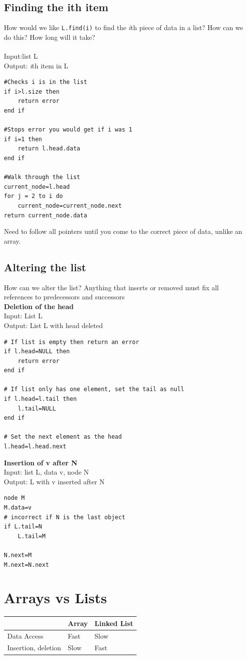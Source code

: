 \documentclass{article}[18pt]
\begin{document}
\subsection{Finding the ith item}
How would we like \texttt{L.find(i)} to find the \textit{i}th piece of data in a list? How can we do this? How long will it take?\\
\\
Input:list L\\
Output: \textit{i}th item in L\\
\begin{lstlisting}[mathescape=true]
#Checks i is in the list
if i>l.size then
	return error
end if

#Stops error you would get if i was 1
if i=1 then 
	return l.head.data
end if

#Walk through the list
current_node=l.head
for j = 2 to i do
	current_node=current_node.next
return current_node.data
\end{lstlisting}
Need to follow all pointers until you come to the correct piece of data, unlike an array.
\subsection{Altering the list}
How can we alter the list? Anything that inserts or removed must fix all references to predecessors and successors\\
\textbf{Deletion of the head}\\
Input: List L\\
Output: List L with head deleted\\
\begin{lstlisting}[mathescape=true]
# If list is empty then return an error
if l.head=NULL then
	return error
end if

# If list only has one element, set the tail as null
if l.head=l.tail then
	l.tail=NULL
end if

# Set the next element as the head
l.head=l.head.next
\end{lstlisting}


\textbf{Insertion of v after N}\\
Input: list L, data v, node N\\
Output: L with v inserted after N
\begin{lstlisting}[mathescape=true]
node M
M.data=v
# incorrect if N is the last object
if L.tail=N
	L.tail=M

N.next=M
M.next=N.next
\end{lstlisting}
\section{Arrays vs Lists}
\begin{tabularx}{\textwidth}{X|X|X}
                    & Array & Linked List \\ \hline
Data Access        
&
Fast
&
Slow

\\ \hline
Insertion, deletion 
&
Slow
&   
Fast
         
\end{tabularx}
\end{document}
